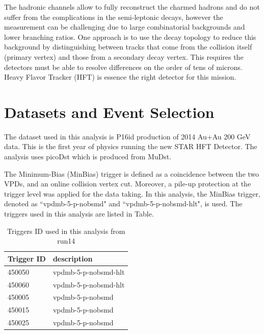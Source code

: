 \documentclass[a4paper]{article}
\begin{document}
The hadronic channels allow to fully reconstruct the charmed hadrons and do not suffer from the complications in the semi-leptonic decays, however the measurement can be challenging due to large combinatorial backgrounds and lower branching ratios. One approach is to use the decay topology to reduce this background by distinguishing between tracks that come from the collision itself (primary vertex) and those from a secondary decay vertex. This requires the detectors must be able to resolve differences on the order of tens of microns. Heavy Flavor Tracker (HFT) is essence the right detector for this mission.

\section{\label{dataset}Datasets and Event Selection}

The dataset used in this analysis is P16id production of 2014 Au+Au 200 GeV data. This is the first year of physics running the new STAR HFT Detector. The analysis uses picoDst which is produced from MuDst.

The Minimum-Bias (MinBias) trigger is defined as a coincidence between the two VPDs, and an online collision vertex cut. Moreover, a pile-up protection at the trigger level was applied for the data taking. In this analysis, the MinBias trigger, denoted as ``vpdmb-5-p-nobsmd" and ``vpdmb-5-p-nobsmd-hlt", is used. The triggers used in this analysis are listed in Table.

\begin{table}[htp]
\centering
\caption{Triggers ID used in this analysis from run14}
\label{trigger}
	\begin{center}
	\begin{tabular}{l|l}
	Trigger ID	& description\\ \hline
	450050		& vpdmb-5-p-nobsmd-hlt\\ \hline
	450060		& vpdmb-5-p-nobsmd-hlt\\ \hline
	450005		& vpdmb-5-p-nobsmd\\ \hline
	450015		& vpdmb-5-p-nobsmd\\ \hline
	450025		& vpdmb-5-p-nobsmd\\ \hline
	\end{tabular}
	\end{center}
\end{table}
\end{document}
